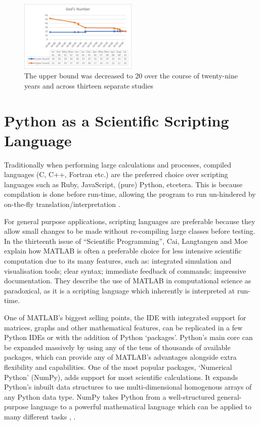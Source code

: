 \documentclass{report}
\begin{document}
   	\begin{figure}[h]
    	\begin{center}
    		\includegraphics[width=0.5\textwidth]{Images/GodsNumberGraph.jpg}
    		\caption{The upper bound was decreased to 20 over the course of twenty-nine years and across thirteen separate studies \cite{Rokicki2010}}
    		\label{fig:godsnumbergraph}
    	\end{center}
    \end{figure}
    
    \section{Python as a Scientific Scripting Language}
    Traditionally when performing large calculations and processes, compiled languages (C, C++, Fortran etc.) are the preferred choice over scripting languages such as Ruby, JavaScript, (pure) Python, etcetera. This is because compilation is done before run-time, allowing the program to run un-hindered by on-the-fly translation/interpretation \cite{Cai2005}.
    
    For general purpose applications, scripting languages are preferable because they allow small changes to be made without re-compiling large classes before testing. In the thirteenth issue of \enquote{Scientific Programming}, Cai, Langtangen and Moe \cite{Cai2005} explain how MATLAB is often a preferable choice for less intensive scientific computation due to its many features, such as: integrated simulation and visualisation tools; clear syntax; immediate feedback of commands; impressive documentation. They describe the use of MATLAB in computational science as paradoxical, as it is a scripting language which inherently is interpreted at run-time.
    
    One of MATLAB’s biggest selling points, the IDE with integrated support for matrices, graphs and other mathematical features, can be replicated in a few Python IDEs or with the addition of Python ‘packages’. Python’s main core can be expanded massively by using any of the tens of thousands of available packages, which can provide any of MATLAB’s advantages alongside extra flexibility and capabilities. One of the most popular packages, ‘Numerical Python’ (NumPy), adds support for most scientific calculations. It expands Python’s inbuilt data structures to use multi-dimensional homogenous arrays of any Python data type. NumPy takes Python from a well-structured general-purpose language to a powerful mathematical language which can be applied to many different tasks \cite{Cai2005}, \cite{Oliphant2006}.
    
\end{document}
